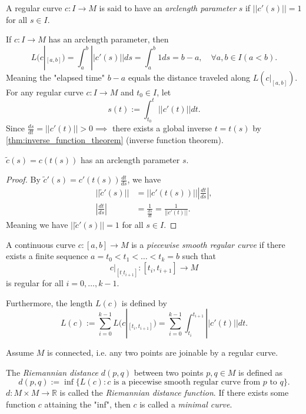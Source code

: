 \begin{definition}
A regular curve $c:I\to M$ is said to have an \emph{arclength parameter} $s$ if $||c'(s)|| = 1$ for all $s \in I$.
\end{definition}
If $c:I\to M$ has an arclength parameter, then
\[
L(c|_{[a,b]}) = \int^b_a ||c'(s)|| ds = \int^b_a 1 ds = b-a, \quad \forall a,b \in I (a < b).
\]
Meaning the "elapsed time" $b-a$ equals the distance traveled along $L(c|_{[a,b]})$.
For any regular curve $c:I\to M$ and $t_0 \in I$, let
\[
s(t) := \int^t_{t_0} ||c'(t)|| dt.
\]
Since $\frac{ds}{dt} = ||c'(t)|| > 0 \implies$ there exists a global inverse $t=t(s)$ by \autoref{thm:inverse_function_theorem} (inverse function theorem).

\begin{lemma}
$\tilde{c}(s) = c(t(s))$ has an arclength parameter $s$.
\end{lemma}
\begin{proof}
By $\tilde{c}'(s) = c'(t(s)) \frac{dt}{ds}$, we have
\[
\begin{aligned}
||\tilde{c}'(s)|| &= ||c'(t(s))|| \left|\frac{dt}{ds}\right|,\\
\left|\frac{dt}{ds}\right| &= \frac{1}{\frac{ds}{dt}} = \frac{1}{||c'(t)||}.
\end{aligned}
\]
Meaning we have $||\tilde{c}'(s)|| = 1$ for all $s \in I$.
\end{proof}

\begin{definition}
A continuous curve $c:[a,b]\to M$ is a \emph{piecewise smooth regular curve} if there exists a finite sequence $a = t_0 < t_1 < \dots < t_k = b$ such that
\[
c|_{[t_,t_{i+1}]}:[t_i,t_{i+1}] \to M
\]
is regular for all $i = 0, \dots, k-1$.

Furthermore, the length $L(c)$ is defined by
\[
L(c) := \sum^{k-1}_{i=0} L(c|_{[t_i,t_{i+1}]}) = \sum^{k-1}_{i=0} \int^{t_{i+1}}_{t_i} ||c'(t)|| dt.
\]
\end{definition}

Assume $M$ is connected, i.e. any two points are joinable by a regular curve.
\begin{definition}
The \emph{Riemannian distance} $d(p,q)$ between two points $p, q \in M$ is defined as
\[
d(p,q) := \inf \{ L(c) : c \text{ is a piecewise smooth regular curve from } p \text{ to } q \}.
\]
$d:M\times M \to \mathbb{R}$ is called the \emph{Riemannian distance function}.
If there exists some function $c$ attaining the "inf", then $c$ is called a \emph{minimal curve}.
\end{definition}

